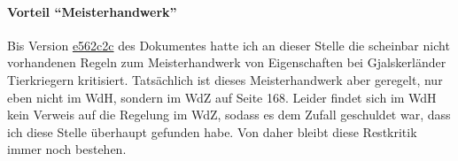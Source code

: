 \paragraph{Vorteil \enquote{Meisterhandwerk}}
Bis Version \href{https://github.com/kreuvf/dsa-regeln-viertelzauberer/tree/e562c2c526ef68cc7c8058f152e65a53935a8aa2}{e562c2c} des Dokumentes hatte ich an dieser Stelle die scheinbar nicht vorhandenen Regeln zum Meisterhandwerk von Eigenschaften bei Gjalskerländer Tierkriegern kritisiert. Tatsächlich ist dieses Meisterhandwerk aber geregelt, nur eben nicht im WdH, sondern im WdZ auf Seite 168. Leider findet sich im WdH kein Verweis auf die Regelung im WdZ, sodass es dem Zufall geschuldet war, dass ich diese Stelle überhaupt gefunden habe. Von daher bleibt diese Restkritik immer noch bestehen.
